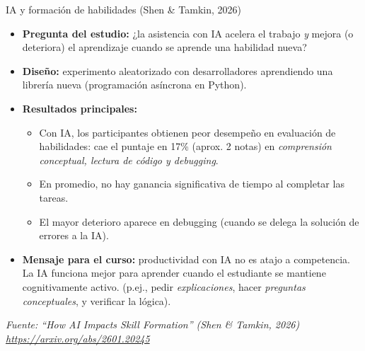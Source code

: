 \documentclass[10pt, xcolor=dvipsnames]{beamer}
\begin{document}
\begin{frame}{IA y formación de habilidades (Shen \& Tamkin, 2026)}
\small
\begin{itemize}
  \item \textbf{Pregunta del estudio:} ¿la asistencia con IA acelera el trabajo \textit{y} mejora (o deteriora) el aprendizaje cuando se aprende una habilidad nueva? \vspace{0.1cm}
  
  \item \textbf{Diseño:} experimento aleatorizado con desarrolladores aprendiendo una librería nueva (programación asíncrona en Python). \vspace{0.1cm}
  
  \item \textbf{Resultados principales:}
  \begin{itemize}
    \item Con IA, los participantes obtienen peor desempeño en evaluación de habilidades: cae el puntaje en 17\% (aprox. 2 notas) en \textit{comprensión conceptual, lectura de código y debugging}. 
    \item En promedio, no hay ganancia significativa de tiempo al completar las tareas.
    \item El mayor deterioro aparece en debugging (cuando se delega la solución de errores a la IA).
  \end{itemize} \vspace{0.1cm}
  
  \item \textbf{Mensaje para el curso:} productividad con IA no es atajo a competencia.
        La IA funciona mejor para aprender cuando el estudiante se mantiene cognitivamente activo.
        (p.ej., pedir \textit{explicaciones}, hacer \textit{preguntas conceptuales}, y verificar la lógica).
\end{itemize}

\vspace{0.15cm}
\footnotesize
\textit{Fuente: ``How AI Impacts Skill Formation'' (Shen \& Tamkin, 2026) \href{https://arxiv.org/abs/2601.20245}{https://arxiv.org/abs/2601.20245}}
\end{frame}
\end{document}
